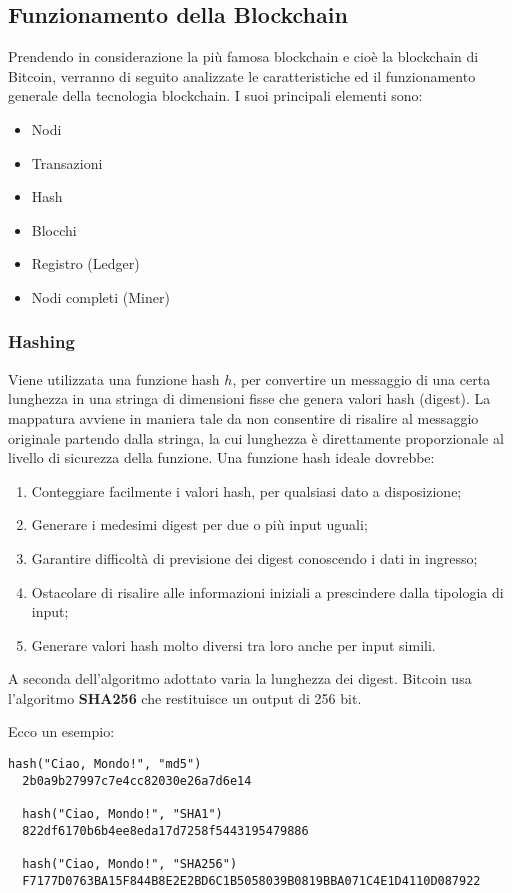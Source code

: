 \subsection{Funzionamento della Blockchain}
Prendendo in considerazione la più famosa blockchain e cioè la blockchain di Bitcoin, verranno di seguito analizzate le caratteristiche ed il funzionamento generale della tecnologia blockchain. I suoi principali elementi sono:

\begin{itemize}
  \item Nodi
  \item Transazioni
  \item Hash
  \item Blocchi
  \item Registro (Ledger)
  \item Nodi completi (Miner)
\end{itemize}

\subsubsection{Hashing}
Viene utilizzata una funzione hash \(h\), per convertire un messaggio di una certa lunghezza in una stringa di dimensioni fisse che genera valori hash (digest). La mappatura avviene in maniera tale da non consentire di risalire al messaggio originale partendo dalla stringa, la cui lunghezza è direttamente proporzionale al livello di sicurezza della funzione. Una funzione hash ideale dovrebbe:

\begin{enumerate}
  \item Conteggiare facilmente i valori hash, per qualsiasi dato a disposizione;
  \item Generare i medesimi digest per due o più input uguali;
  \item Garantire difficoltà di previsione dei digest conoscendo i dati in ingresso;
  \item Ostacolare di risalire alle informazioni iniziali a prescindere dalla tipologia di input;
  \item Generare valori hash molto diversi tra loro anche per input simili.
\end{enumerate}

A seconda dell'algoritmo adottato varia la lunghezza dei digest. Bitcoin
usa l'algoritmo \textbf{SHA256} che restituisce un output di 256 bit.

Ecco un esempio:
\begin{lstlisting}[language=logfile,breaklines]
  hash("Ciao, Mondo!", "md5")
  2b0a9b27997c7e4cc82030e26a7d6e14

  hash("Ciao, Mondo!", "SHA1")
  822df6170b6b4ee8eda17d7258f5443195479886

  hash("Ciao, Mondo!", "SHA256")
  F7177D0763BA15F844B8E2E2BD6C1B5058039B0819BBA071C4E1D4110D087922
\end{lstlisting}

